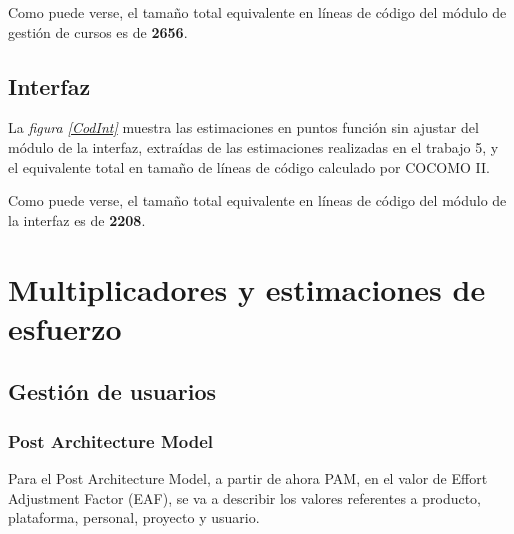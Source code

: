 \documentclass[11pt,a4paper,spanish,twoside]{report}
\begin{document}
Como puede verse, el tamaño total equivalente en líneas de código del módulo
de gestión de cursos es de \textbf{2656}.

\section{Interfaz}
La \emph{figura \ref{CodInt}} muestra las estimaciones en puntos función sin
ajustar del módulo de la interfaz, extraídas de las estimaciones realizadas en
el trabajo 5, y el equivalente total en tamaño de líneas de código calculado
por COCOMO II.


Como puede verse, el tamaño total equivalente en líneas de código del módulo
de la interfaz es de \textbf{2208}.

\chapter{Multiplicadores y estimaciones de esfuerzo}
\section{Gestión de usuarios}
\subsection{Post Architecture Model}
Para el Post Architecture Model, a partir de ahora PAM, en el valor de Effort
Adjustment Factor (EAF), se va a describir los valores referentes a producto,
plataforma, personal, proyecto y usuario. 
\end{document}
